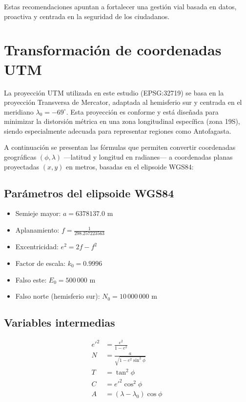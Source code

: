 \documentclass[12pt]{article}
\begin{document}
{Estas recomendaciones apuntan a fortalecer una gestión vial basada en datos, proactiva y centrada en la seguridad de los ciudadanos.

\newpage

\appendix
\section{Transformación de coordenadas UTM}
\label{ap:utm}

La proyección UTM utilizada en este estudio (EPSG:32719) se basa en la proyección Transversa de Mercator, adaptada al hemisferio sur y centrada en el meridiano $\lambda_0 = -69^\circ$. Esta proyección es conforme y está diseñada para minimizar la distorsión métrica en una zona longitudinal específica (zona 19S), siendo especialmente adecuada para representar regiones como Antofagasta.

A continuación se presentan las fórmulas que permiten convertir coordenadas geográficas $(\phi, \lambda)$ —latitud y longitud en radianes— a coordenadas planas proyectadas $(x, y)$ en metros, basadas en el elipsoide WGS84:

\subsection*{Parámetros del elipsoide WGS84}

\begin{itemize}
  \item Semieje mayor: $a = 6378137.0$ m
  \item Aplanamiento: $f = \frac{1}{298.257223563}$
  \item Excentricidad: $e^2 = 2f - f^2$
  \item Factor de escala: $k_0 = 0.9996$
  \item Falso este: $E_0 = 500\,000$ m
  \item Falso norte (hemisferio sur): $N_0 = 10\,000\,000$ m
\end{itemize}

\subsection*{Variables intermedias}

\begin{align*}
e'^2 &= \frac{e^2}{1 - e^2} \\
N &= \frac{a}{\sqrt{1 - e^2 \sin^2 \phi}} \\
T &= \tan^2 \phi \\
C &= e'^2 \cos^2 \phi \\
A &= (\lambda - \lambda_0) \cos \phi
\end{align*}

}
\end{document}
